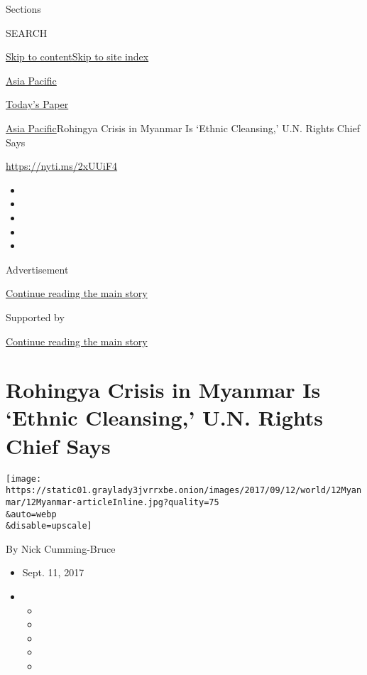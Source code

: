 Sections

SEARCH

\protect\hyperlink{site-content}{Skip to
content}\protect\hyperlink{site-index}{Skip to site index}

\href{https://www.nytimes3xbfgragh.onion/section/world/asia}{Asia
Pacific}

\href{https://myaccount.nytimes3xbfgragh.onion/auth/login?response_type=cookie\&client_id=vi}{}

\href{https://www.nytimes3xbfgragh.onion/section/todayspaper}{Today's
Paper}

\href{/section/world/asia}{Asia Pacific}\textbar{}Rohingya Crisis in
Myanmar Is `Ethnic Cleansing,' U.N. Rights Chief Says

\url{https://nyti.ms/2xUUiF4}

\begin{itemize}
\item
\item
\item
\item
\item
\end{itemize}

Advertisement

\protect\hyperlink{after-top}{Continue reading the main story}

Supported by

\protect\hyperlink{after-sponsor}{Continue reading the main story}

\hypertarget{rohingya-crisis-in-myanmar-is-ethnic-cleansing-un-rights-chief-says}{%
\section{Rohingya Crisis in Myanmar Is `Ethnic Cleansing,' U.N. Rights
Chief
Says}\label{rohingya-crisis-in-myanmar-is-ethnic-cleansing-un-rights-chief-says}}

\texttt{[image: https://static01.graylady3jvrrxbe.onion/images/2017/09/12/world/12Myanmar/12Myanmar-articleInline.jpg?quality=75\\\&auto=webp\\\&disable=upscale]}

By Nick Cumming-Bruce

\begin{itemize}
\item
  Sept. 11, 2017
\item
  \begin{itemize}
  \item
  \item
  \item
  \item
  \item
  \end{itemize}
\end{itemize}

